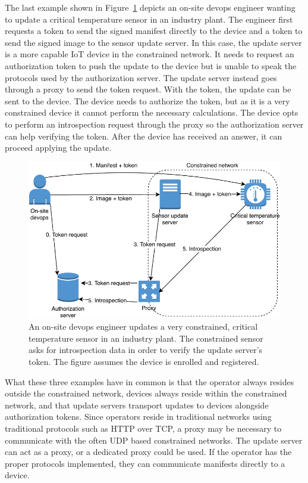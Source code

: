 \documentclass[0-thesis.tex]{subfiles}
\begin{document}
The last example shown in Figure~\ref{fig:industry} depicts an on-site devops engineer
wanting to update a critical temperature sensor in an industry plant. The engineer first
requests a token to send the signed manifest directly to the device and a token to send
the signed image to the sensor update server. In this case, the update server is a more
capable IoT device in the constrained network. It needs to request an authorization token
to push the update to the device but is unable to speak the protocols used by the
authorization server. The update server instead goes through a proxy to send the token
request. With the token, the update can be sent to the device. The device needs to
authorize the token, but as it is a very constrained device it cannot perform the
necessary calculations. The device opts to perform an introspection request through the
proxy so the authorization server can help verifying the token. After the device has
received an answer, it can proceed applying the update.

\begin{figure}[t]
    \caption{An on-site devops engineer updates a very constrained, critical temperature
                sensor in an industry plant. The constrained sensor asks for introspection
                data in order to verify the update server's token. The figure assumes the device is enrolled and registered.}
    \label{fig:industry}
    \includegraphics{images/use-case-industry.pdf}
\end{figure}

What these three examples have in common is that the operator always resides outside the
constrained network, devices always reside within the constrained network, and that update
servers transport updates to devices alongside authorization tokens. Since operators
reside in traditional networks using traditional protocols such as HTTP over TCP, a proxy
may be necessary to communicate with the often UDP based constrained networks. The update
server can act as a proxy, or a dedicated proxy could be used. If the operator has the
proper protocols implemented, they can communicate manifests directly to a device.
\end{document}
